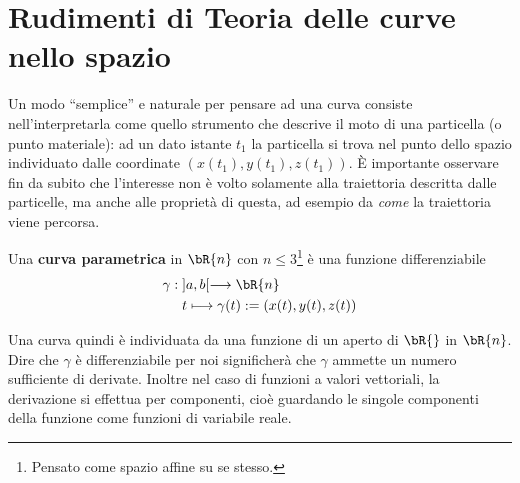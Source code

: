 \section{Rudimenti di Teoria delle curve nello spazio}
Un modo ``semplice'' e naturale per pensare ad una curva consiste 
nell'interpretarla 
come quello strumento che descrive il moto di una particella (o punto 
materiale): 
ad un dato istante $t_1$ la particella si trova nel punto dello spazio 
individuato dalle
coordinate $(x(t_1),y(t_1),z(t_1))$. \`E importante osservare fin da subito che 
l'interesse
non \`e volto solamente alla traiettoria descritta dalle particelle, ma anche 
alle propriet\`a
di questa, ad esempio da {\it come} la traiettoria viene percorsa. 
\begin{figure}[h!]
\begin{center}
{\small
{}
}
\end{center}
\end{figure}
\begin{definition}
  Una {\bf curva parametrica} in $\bR{n}$ con $n\le 3$\footnote{Pensato come 
spazio affine su se stesso.} 
  \`e una funzione differenziabile 
  \[\begin{aligned}
    \gamma: & \; ]a,b[ \longrightarrow \bR{n}\\
    &\;  t\longmapsto \gamma(t):=(x(t),y(t),z(t))
  \end{aligned}\]
\end{definition}
Una curva quindi \`e individuata da una funzione di un aperto di $\bR{}$ in 
$\bR{n}$.
Dire che $\gamma$ \`e differenziabile per noi significher\`a che $\gamma$ 
ammette 
un numero sufficiente di derivate. Inoltre nel caso di funzioni a valori 
vettoriali, 
la derivazione si effettua per componenti, cio\`e guardando le singole 
componenti 
della funzione come funzioni di variabile reale.

